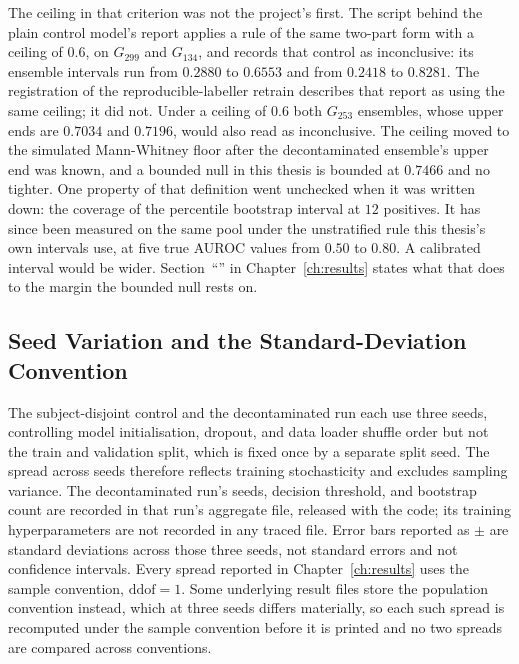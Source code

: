 The ceiling in that criterion was not the project's first. The script behind the plain control model's report applies a rule of the same two-part form with a ceiling of $0.6$, on $G_{299}$ and $G_{134}$, and records that control as inconclusive: its ensemble intervals run from $0.2880$ to $0.6553$ and from $0.2418$ to $0.8281$. The
registration of the reproducible-labeller retrain describes that report as using the same ceiling; it did not.
Under a ceiling of $0.6$ both $G_{253}$ ensembles, whose upper ends are $0.7034$ and $0.7196$, would also read as
inconclusive. The ceiling moved to the simulated Mann-Whitney floor after the decontaminated ensemble's upper end was
known, and a bounded null in this thesis is bounded at $0.7466$ and no tighter. One property of that definition went unchecked when it was written down: the coverage of the
percentile bootstrap interval at $12$ positives. It has since been measured on the same pool under
the unstratified rule this thesis's own intervals use, at five true AUROC values from $0.50$ to
$0.80$. A calibrated
interval would be wider. Section~``'' in Chapter~\ref{ch:results} states
what that does to the margin the bounded null rests on.

\subsection{Seed Variation and the Standard-Deviation Convention}

The subject-disjoint control and the decontaminated run each use three seeds, controlling model
initialisation, dropout, and data loader shuffle order but not the train and validation split, which
is fixed once by a separate split seed. The spread across seeds therefore reflects training
stochasticity and excludes sampling variance. The decontaminated run's seeds, decision threshold, and bootstrap
count are recorded in that run's aggregate file, released with the code; its training hyperparameters are not recorded in any traced file. Error bars reported as $\pm$ are standard
deviations across those three seeds, not standard errors and not confidence intervals. Every
spread reported in Chapter~\ref{ch:results} uses the sample convention, $\mathrm{ddof} = 1$. Some
underlying result files store the population convention instead, which at three seeds differs
materially, so each such spread is recomputed under the sample convention before it is printed and
no two spreads are compared across conventions.

